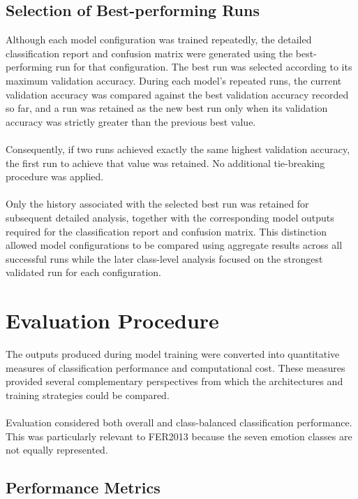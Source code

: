 \documentclass[12pt, a4paper]{report}
\let\oldsection\section
\renewcommand{\section}{%
    \Needspace{6\baselineskip}%
    \oldsection
}
\let\oldsubsection\subsection
\renewcommand{\subsection}{%
    \Needspace{6\baselineskip}%
    \oldsubsection
}
\begin{document}
			\subsection{Selection of Best-performing Runs}
				
				Although each model configuration was trained repeatedly, the detailed classification report and confusion matrix were generated using the best-performing run for that configuration. The best run was selected according to its maximum validation accuracy. During each model's repeated runs, the current validation accuracy was compared against the best validation accuracy recorded so far, and a run was retained as the new best run only when its validation accuracy was strictly greater than the previous best value.\\\\
				Consequently, if two runs achieved exactly the same highest validation accuracy, the first run to achieve that value was retained. No additional tie-breaking procedure was applied.\\\\
				Only the history associated with the selected best run was retained for subsequent detailed analysis, together with the corresponding model outputs required for the classification report and confusion matrix. This distinction allowed model configurations to be compared using aggregate results across all successful runs while the later class-level analysis focused on the strongest validated run for each configuration.
				
		\section{Evaluation Procedure}
			
			The outputs produced during model training were converted into quantitative measures of classification performance and computational cost. These measures provided several complementary perspectives from which the architectures and training strategies could be compared.\\\\
			Evaluation considered both overall and class-balanced classification performance. This was particularly relevant to FER2013 because the seven emotion classes are not equally represented.
			
			\newpage
			\subsection{Performance Metrics}
				
\end{document}
